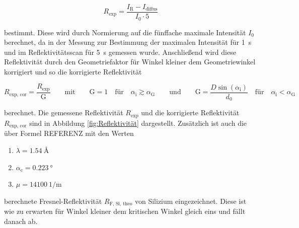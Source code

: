     \begin{equation*}
      R_{\text{exp}} = \frac{I_{\text{R}} - I_{\text{diffus}}}{I_0 \cdot 5}
    \end{equation*}
    
    bestimmt. Diese wird durch Normierung auf die fünffache maximale Intensität $I_0$ berechnet, da in der Messung zur Bestimmung der maximalen Intensität für \SI{1}{\second} und im Reflektivitätsscan für
    \SI{5}{\second} gemessen wurde. Anschließend wird diese Reflektivität durch den Geometriefaktor für Winkel kleiner dem Geometriewinkel korrigiert und so die korrigierte Reflektivität

    \begin{equation*}
      R_{\text{exp, cor}} = \frac{R_{\text{exp}}}{\text{G}} \qquad \text{mit} \qquad \text{G}=1 \quad \text{für} \quad \alpha_{\text{i}} \gtrsim \alpha_{\text{G}} \qquad \text{und} \qquad \text{G}=\frac{D\sin\left(\alpha_{\text{i}}\right)}{d_0} \quad \text{für} \quad \alpha_{\text{i}} < \alpha_{\text{G}}
    \end{equation*}

    berechnet. Die gemessene Reflektivität $R_{\text{exp}}$ und die korrigierte Reflektivität $R_{\text{exp, cor}}$ sind in Abbildung \ref{fig:Reflektivität} dargestellt. Zusätzlich ist auch die über Formel 
    REFERENZ mit den Werten

    \begin{enumerate}
      \item $\lambda = \SI{1.54}{\angstrom}$
      \item $\alpha_{\text{c}} = \SI{0.223}{\degree}$
      \item $\mu = \SI{14100}{1\per\metre}$
    \end{enumerate}

    berechnete Fresnel-Reflektivität $R_{\text{F, Si, theo}}$ von Silizium eingezeichnet. Diese ist wie zu erwarten für Winkel kleiner dem kritischen Winkel gleich eins und fällt danach ab.

